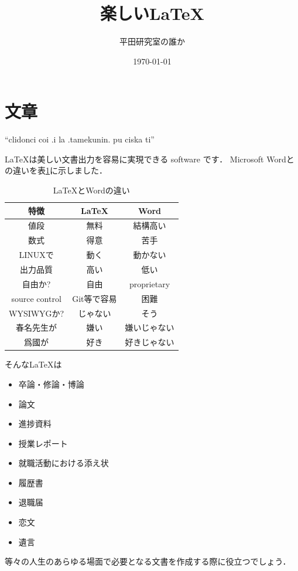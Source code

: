 \documentclass[a4j, uplatex, dvipdfmx]{jsarticle}
\title{楽しい\LaTeX}
\author{平田研究室の誰か}
\date{\today}
\begin{document}
\maketitle
\section{文章}
  ``clidonci coi .i la .tamekunin. pu ciska ti''
  \par \LaTeX は美しい文書出力を容易に実現できる software です．
  Microsoft Wordとの違いを表\ref{tbl_latexVsWord}に示しました．
    \begin{table}[btp]
      \center
      \caption{\LaTeX とWordの違い} \label{tbl_latexVsWord}
      \begin{tabular}{c||c|c}
        特徴 & \LaTeX & Word \\ \hline
        値段 & 無料 & 結構高い \\
        数式 & 得意 & 苦手 \\
        LINUXで & 動く & 動かない \\
        出力品質 & 高い & 低い \\
        自由か? & 自由 & proprietary \\
        source control & Git等で容易 & 困難 \\
        WYSIWYGか? & じゃない & そう \\
        春名先生が & 嫌い & 嫌いじゃない \\
        爲國が & 好き & 好きじゃない
      \end{tabular}
    \end{table}
  そんな\LaTeX は
    \begin{itemize}
      \item 卒論・修論・博論
      \item 論文
      \item 進捗資料
      \item 授業レポート
      \item 就職活動における添え状
      \item 履歴書
      \item 退職届
      \item 恋文
      \item 遺言
    \end{itemize}
  等々の人生のあらゆる場面で必要となる文書を作成する際に役立つでしょう．
\end{document}
